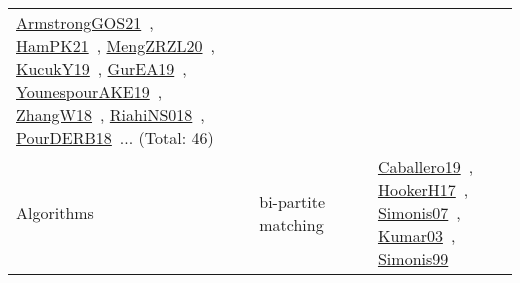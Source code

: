 {\begin{longtable}{lp{3cm}>{\raggedright\arraybackslash}p{6cm}>{\raggedright\arraybackslash}p{6cm}>{\raggedright\arraybackslash}p{8cm}}
\href{../works/ArmstrongGOS21.pdf}{ArmstrongGOS21}~\cite{ArmstrongGOS21}, \href{../works/HamPK21.pdf}{HamPK21}~\cite{HamPK21}, \href{../works/MengZRZL20.pdf}{MengZRZL20}~\cite{MengZRZL20}, \href{../works/KucukY19.pdf}{KucukY19}~\cite{KucukY19}, \href{../works/GurEA19.pdf}{GurEA19}~\cite{GurEA19}, \href{../works/YounespourAKE19.pdf}{YounespourAKE19}~\cite{YounespourAKE19}, \href{../works/ZhangW18.pdf}{ZhangW18}~\cite{ZhangW18}, \href{../works/RiahiNS018.pdf}{RiahiNS018}~\cite{RiahiNS018}, \href{../works/PourDERB18.pdf}{PourDERB18}~\cite{PourDERB18}... (Total: 46)\\
Algorithms & bi-partite matching &  &  & \href{../works/Caballero19.pdf}{Caballero19}~\cite{Caballero19}, \href{../works/HookerH17.pdf}{HookerH17}~\cite{HookerH17}, \href{../works/Simonis07.pdf}{Simonis07}~\cite{Simonis07}, \href{../works/Kumar03.pdf}{Kumar03}~\cite{Kumar03}, \href{../works/Simonis99.pdf}{Simonis99}~\cite{Simonis99}\\

\end{longtable}}
